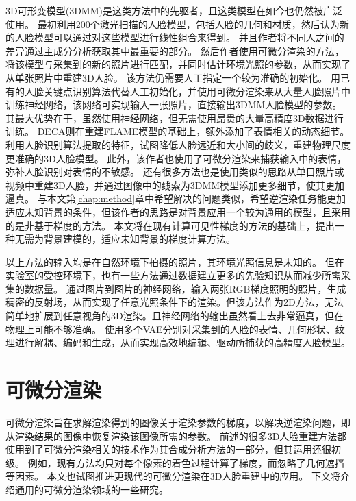 3D可形变模型(3DMM)是这类方法中的先驱者，且这类模型在如今也仍然被广泛使用。
最初\citet{3DMM}利用200个激光扫描的人脸模型，包括人脸的几何和材质，然后认为新的人脸模型可以通过对这些模型进行线性组合来得到。
并且作者将不同人之间的差异通过主成分分析获取其中最重要的部分。
然后作者使用可微分渲染的方法，将该模型与采集到的新的照片进行匹配，并同时估计环境光照的参数，从而实现了从单张照片中重建3D人脸。
该方法仍需要人工指定一个较为准确的初始化。
\citet{deep3d}用已有的人脸关键点识别算法代替人工初始化，并使用可微分渲染来从大量人脸照片中训练神经网络，该网络可实现输入一张照片，直接输出3DMM人脸模型的参数。其最大优势在于，虽然使用神经网络，但无需使用昂贵的大量高精度3D数据进行训练。
DECA\citep{DECA}则在重建FLAME模型的基础上，额外添加了表情相关的动态细节。
\citet{ZielonkaBT22}利用人脸识别算法提取的特征，试图降低人脸远近和大小间的歧义，重建物理尺度更准确的3D人脸模型。
此外，该作者也使用了可微分渲染来捕获输入中的表情，弥补人脸识别对表情的不敏感。
还有很多方法\citep{GarridoVWT13,CaoBZB15,ShiWTC14,IchimBP15}也是使用类似的思路从单目照片或视频中重建3D人脸，并通过图像中的线索为3DMM模型添加更多细节，使其更加逼真。
\citet{SchonbornEFV15}与本文第\ref{chap:method}章中希望解决的问题类似，希望逆渲染任务能更加适应未知背景的条件，但该作者的思路是对背景应用一个较为通用的模型，且采用的是非基于梯度的方法。
本文将在现有计算可见性梯度的方法的基础上，提出一种无需为背景建模的，适应未知背景的梯度计算方法。

以上方法的输入均是在自然环境下拍摄的照片，其环境光照信息是未知的。
但在实验室的受控环境下，也有一些方法通过数据建立更多的先验知识从而减少所需采集的数据量。
\citet{MekaHPZFFKYBDDB19}通过图片到图片的神经网络，输入两张RGB梯度照明的照片，生成稠密的反射场，从而实现了任意光照条件下的渲染。但该方法作为2D方法，无法简单地扩展到任意视角的3D渲染。且神经网络的输出虽然看上去非常逼真，但在物理上可能不够准确。
\citet{ZhangZZLCYXY22}使用多个VAE分别对采集到的人脸的表情、几何形状、纹理进行解耦、编码和生成，从而实现高效地编辑、驱动所捕获的高精度人脸模型。

\section{可微分渲染}

可微分渲染旨在求解渲染得到的图像关于渲染参数的梯度，以解决逆渲染问题，即从渲染结果的图像中恢复渲染该图像所需的参数。
前述的很多3D人脸重建方法都使用到了可微分渲染相关的技术作为其合成分析方法的一部分，但其运用还很初级。
例如，现有方法均只对每个像素的着色过程计算了梯度，而忽略了几何遮挡等因素。
本文也试图推进更现代的可微分渲染在3D人脸重建中的应用。
下文将介绍通用的可微分渲染领域的一些研究。

